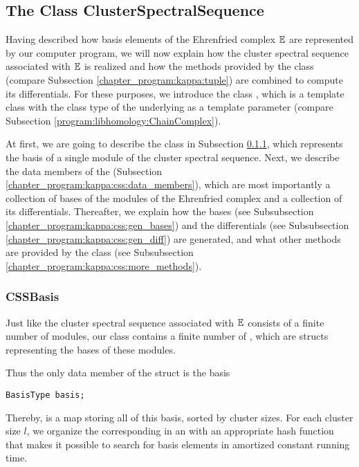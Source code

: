 \subsection{The Class ClusterSpectralSequence}
\label{chapter_program:kappa:css}

Having described how basis elements of the Ehrenfried complex $\mathbb E$ are represented by our computer program, 
we will now explain how the cluster spectral sequence associated with $\mathbb E$ is realized 
and how the methods provided by the class  (compare Subsection \ref{chapter_program:kappa:tuple}) are combined 
to compute its differentials.
For these purposes, we introduce the class , 
which is a template class with the class type of the underlying  as a template parameter
(compare Subsection \ref{program:libhomology:ChainComplex}).

At first, we are going to describe the class  in Subsection \ref{chapter_program:kappa:css:css_basis}, 
which represents the basis of a single module of the cluster spectral sequence. 
Next, we describe the data members of the  (Subsection \ref{chapter_program:kappa:css:data_members}),
which are most importantly a collection of bases of the modules of the Ehrenfried complex and 
a collection of its differentials.
Thereafter, we explain how the bases (see Subsubsection \ref{chapter_program:kappa:css:gen_bases}) and 
the differentials (see Subsubsection \ref{chapter_program:kappa:css:gen_diff}) are generated, 
and what other methods are provided by the class  (see Subsubsection \ref{chapter_program:kappa:css:more_methods}). 

\subsubsection{CSSBasis}
\label{chapter_program:kappa:css:css_basis}

Just like the cluster spectral sequence associated with $\mathbb E$ consists of a finite number of modules, 
our class  contains a finite number of , 
which are structs representing the bases of these modules.

Thus the only data member of the struct  is the basis
\begin{lstlisting}
BasisType basis;
\end{lstlisting}
Thereby,  is a map storing all  of this basis, sorted by cluster sizes.
For each cluster size $l$, we organize the corresponding  in an 
with an appropriate hash function that makes it possible to search for basis elements in amortized constant running time.

